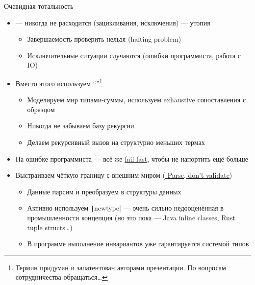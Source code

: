     \begin{frame}[fragile]{Очевидная тотальность \practicalslide}
        \begin{itemize}
            \item[\defi]  --- никогда не расходится (зацикливания, исключения) --- утопия
            \begin{itemize}
                \item Завершаемость проверить нельзя (halting problem)
                \item Исключительные ситуации случаются (ошибки программиста, работа с IO)
            \end{itemize}
            \item Вместо этого используем ``''\footnote{Термин придуман и запатентован авторами презентации. По вопросам сотрудничества обращаться\ldots}
            \begin{itemize}
                \item Моделируем мир типами-суммы, используем exhaustive сопоставления с образцом
                \item Никогда не забываем базу рекурсии
                \item Делаем рекурсивный вызов на структурно меньших термах
            \end{itemize}
            \item На ошибке программиста --- всё же \href{https://en.wikipedia.org/wiki/Fail-fast}{\color{blue}fail fast}, чтобы не напортить ещё больше
            \item Выстраиваем чёткую границу с внешним миром (\underline{\color{blue} \href{https://lexi-lambda.github.io/blog/2019/11/05/parse-don-t-validate/}{Parse, don’t validate}})
            \begin{itemize}
                \item Данные парсим и преобразуем в структуры данных
                \item Активно используем \texttt|newtype| --- очень сильно недооценённая в промышленности концепция (но это пока --- Java inline classes, Rust tuple structs\ldots)
                \item В программе выполнение инвариантов уже гарантируется системой типов
            \end{itemize}
        \end{itemize}
    \end{frame}

